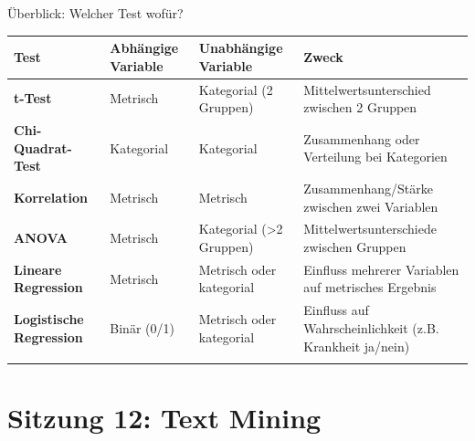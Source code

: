 \documentclass[
  ignorenonframetext,
]{beamer}
\newcounter{none} %
\begin{document}
\begin{frame}{Überblick: Welcher Test wofür?}
\protect{}\label{uxfcberblick-welcher-test-wofuxfcr}
{\def\LTcaptype{none} %
\begin{longtable}[]{@{}
  >{\raggedright\arraybackslash}p{}
  >{\raggedright\arraybackslash}p{}
  >{\raggedright\arraybackslash}p{}
  >{\raggedright\arraybackslash}p{}@{}}
\toprule\noalign{}
\begin{minipage}[b]{\linewidth}\raggedright
Test
\end{minipage} & \begin{minipage}[b]{\linewidth}\raggedright
Abhängige Variable
\end{minipage} & \begin{minipage}[b]{\linewidth}\raggedright
Unabhängige Variable
\end{minipage} & \begin{minipage}[b]{\linewidth}\raggedright
Zweck
\end{minipage} \\
\midrule\noalign{}
\endhead
\textbf{t-Test} & Metrisch & Kategorial (2 Gruppen) &
Mittelwertsunterschied zwischen 2 Gruppen \\
\textbf{Chi-Quadrat-Test} & Kategorial & Kategorial & Zusammenhang oder
Verteilung bei Kategorien \\
\textbf{Korrelation} & Metrisch & Metrisch & Zusammenhang/Stärke
zwischen zwei Variablen \\
\textbf{ANOVA} & Metrisch & Kategorial (\textgreater2 Gruppen) &
Mittelwertsunterschiede zwischen Gruppen \\
\textbf{Lineare Regression} & Metrisch & Metrisch oder kategorial &
Einfluss mehrerer Variablen auf metrisches Ergebnis \\
\textbf{Logistische Regression} & Binär (0/1) & Metrisch oder kategorial
& Einfluss auf Wahrscheinlichkeit (z.B. Krankheit ja/nein) \\
\bottomrule\noalign{}
\end{longtable}
}
\end{frame}

\begin{frame}
\end{frame}

\section{Sitzung 12: Text Mining}\label{sitzung-12-text-mining}
\end{document}
